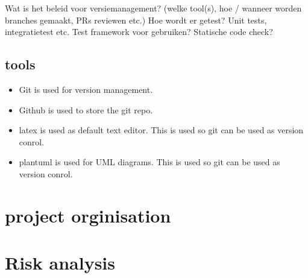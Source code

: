 \documentclass{article} %
\begin{document}
    Wat is het beleid voor versiemanagement? (welke tool(s), hoe / wanneer worden branches gemaakt, PRs reviewen etc.)
    Hoe wordt er getest? Unit tests, integratietest etc. Test framework voor gebruiken? Statische code check?
    \subsection{tools}
    \begin{itemize}
        \item Git is used for version management.
        \item Github is used to store the git repo.
        \item latex is used as default text editor. This is used so git can be used as version conrol.
        \item plantuml is used for UML diagrams. This is used so git can be used as version conrol.
        
    \end{itemize}
    \newpage

    \section{project orginisation}
    \newpage

    \section{Risk analysis}
    \newpage
\end{document}
